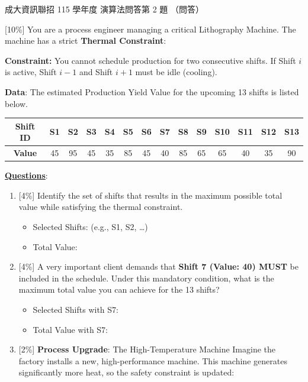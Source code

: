 \begin{pastexam}[label={px:ncku-115-prog-15}]{成大資訊聯招 115 學年度 演算法問答第 2 題}
（問答）

[10\%] You are a process engineer managing a critical Lithography Machine. The machine has a strict
\textbf{Thermal Constraint}:

\hspace*{2em}\textbf{Constraint:} You cannot schedule production for two consecutive shifts. If Shift
$i$ is active, Shift $i-1$ and Shift $i+1$ must be idle (cooling).

\textbf{Data}: The estimated Production Yield Value for the upcoming 13 shifts is listed below.
\begin{center}
\small
\setlength{\tabcolsep}{4pt}
\begin{tabular}{|c|c|c|c|c|c|c|c|c|c|c|c|c|c|}
\hline
\textbf{Shift ID} & S1 & S2 & S3 & S4 & S5 & S6 & S7 & S8 & S9 & S10 & S11 & S12 & S13\\\hline
\textbf{Value} & 45 & 95 & 45 & 35 & 85 & 45 & 40 & 85 & 65 & 65 & 40 & 35 & 90\\\hline
\end{tabular}
\end{center}

\underline{\textbf{Questions}}:
\begin{enumerate}[label=(\arabic*)]
\item {[4\%]} Identify the set of shifts that results in the maximum possible total value while
satisfying the thermal constraint.
\begin{itemize}
\item Selected Shifts: \underline{\hspace{4.5cm}} (e.g., S1, S2, \dots)
\item Total Value: \underline{\hspace{4.5cm}}
\end{itemize}
\item {[4\%]} A very important client demands that \textbf{Shift 7 (Value: 40) MUST} be included in
the schedule. Under this mandatory condition, what is the maximum total value you can achieve for the
13 shifts?
\begin{itemize}
\item Selected Shifts with S7: \underline{\hspace{4.5cm}}
\item Total Value with S7: \underline{\hspace{4.5cm}}
\end{itemize}
\item {[2\%]} \textbf{Process Upgrade}: The High-Temperature Machine Imagine the factory installs a
new, high-performance machine. This machine generates significantly more heat, so the safety
constraint is updated:


\end{enumerate}
\end{pastexam}
